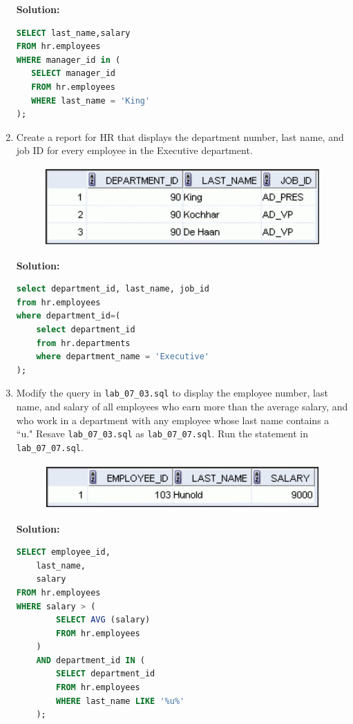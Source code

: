 \documentclass[a4paper,12pt]{article}
\begin{document}
\begin{enumerate}
    \textbf{Solution: }
    \begin{lstlisting}[language=SQL]
SELECT last_name,salary
FROM hr.employees
WHERE manager_id in (
   SELECT manager_id
   FROM hr.employees
   WHERE last_name = 'King'
);
    \end{lstlisting}
        \item Create a report for HR that displays the department number, last name, and job ID for every
employee in the Executive department.

    
    \begin{figure}[h]
        \centering
            \centering
            \includegraphics[width=.6\linewidth]{graphics/76.png}
    \end{figure}
\newpage
    \textbf{Solution: }
    \begin{lstlisting}[language=SQL]
select department_id, last_name, job_id
from hr.employees
where department_id=(
    select department_id
    from hr.departments
    where department_name = 'Executive'
);
    \end{lstlisting}
        \item Modify the query in \texttt{lab\_07\_03.sql} to display the employee number, last name, and salary
of all employees who earn more than the average salary, and who work in a department with
any employee whose last name contains a ``u." Resave \texttt{lab\_07\_03.sql} as
\texttt{lab\_07\_07.sql}. Run the statement in \texttt{lab\_07\_07.sql}.

    
    \begin{figure}[h]
        \centering
            \centering
            \includegraphics[width=.6\linewidth]{graphics/77.png}
    \end{figure}

    \textbf{Solution: }
    \begin{lstlisting}[language=SQL]
SELECT employee_id,
    last_name,
    salary
FROM hr.employees
WHERE salary > (
        SELECT AVG (salary)
        FROM hr.employees
    )
    AND department_id IN (
        SELECT department_id
        FROM hr.employees
        WHERE last_name LIKE '%u%'
    );
    \end{lstlisting}
\end{enumerate}
\end{document}

